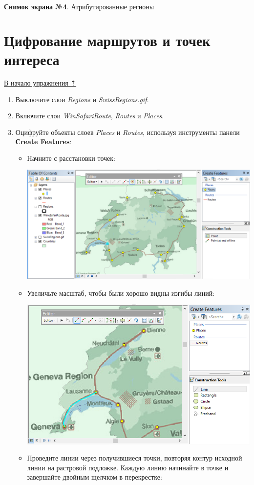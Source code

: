 \documentclass[]{book}
\theoremstyle{definition}
\theoremstyle{definition}
\theoremstyle{definition}
\theoremstyle{remark}
\begin{document}
\textbf{Снимок экрана №4}. Атрибутированные регионы

\hypertarget{map-ref-general-routes-poi}{%
\section{Цифрование маршрутов и точек
интереса}\label{map-ref-general-routes-poi}}

\protect\hyperlink{map-ref-general}{В начало упражнения ⇡}

\begin{enumerate}
\def\labelenumi{\arabic{enumi}.}
\item
  Выключите слои \emph{Regions} и \emph{SwissRegions.gif}.
\item
  Включите слои \emph{WinSafariRoute}, \emph{Routes} и \emph{Places}.
\item
  Оцифруйте объекты слоев \emph{Places} и \emph{Routes}, используя
  инструменты панели \textbf{Сreate Features}:

  \begin{itemize}
  \item
    Начните с расстановки точек:

    \includegraphics{images/Ex05/image25.png}
  \item
    Увеличьте масштаб, чтобы были хорошо видны изгибы линий:

    \includegraphics{images/Ex05/image26.png}
  \item
    Проведите линии через получившиеся точки, повторяя контур исходной
    линии на растровой подложке. Каждую линию начинайте в точке и
    завершайте двойным щелчком в перекрестке:


\end{itemize}
\end{enumerate}
\end{document}
